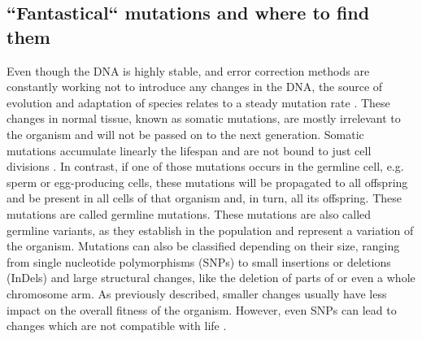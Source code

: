 \subsection[Mutations]{``Fantastical`` mutations and where to find them}
\label{intro-sec:mutations}
Even though the DNA is highly stable, and error correction methods are constantly working not to introduce any changes in the DNA, the source of evolution and adaptation of species relates to a steady mutation rate \cite{Darwin2010,Sprouffske2018}. These changes in normal tissue, known as somatic mutations, are mostly irrelevant to the organism  and will not be passed on to the next generation. Somatic mutations accumulate linearly  the  lifespan  and are not bound to just cell divisions \cite{Alexandrov2015,Moore2021,Cagan2022}. 
In contrast, if one of those mutations occurs in the germline cell, e.g. sperm or egg-producing cells, these mutations will be propagated to all offspring and be present in all cells of that organism and, in turn, all its offspring. These mutations are called germline mutations. These mutations are also called germline variants, as they establish in the population and represent a variation of the organism.
Mutations can also be classified depending on their size, ranging from single nucleotide polymorphisms (SNPs) to small insertions or deletions (InDels) and large structural changes, like the deletion of parts of or even a whole chromosome arm. As previously described, smaller changes usually have less impact on the overall fitness of the organism. However, even SNPs can lead to changes which are not compatible with life \cite{Shamseldin2015,Frey2021}.

